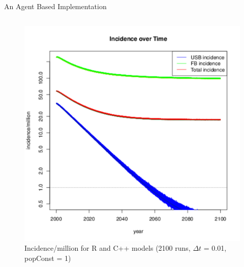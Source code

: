 \documentclass[final]{beamer}
\begin{document}
\begin{frame}
\begin{columns}
\begin{column}{.3\textwidth}
\begin{block}{An Agent Based Implementation}
\begin{block}{}
\begin{column}{.45\textwidth}
\begin{figure}[h]
\begin{center}
                \includegraphics[width=\textwidth]{finalRunSmall}
              \end{center}
              \caption{Incidence/million for R and C++ models (2100 runs, $\Delta t$ = 0.01, popConst = 1)}
              \label{fig:finalRun}
            \end{figure}
          \end{column}
        \end{block}
      \end{block}
      

\end{column}
\end{columns}
\end{frame}
\end{document}
